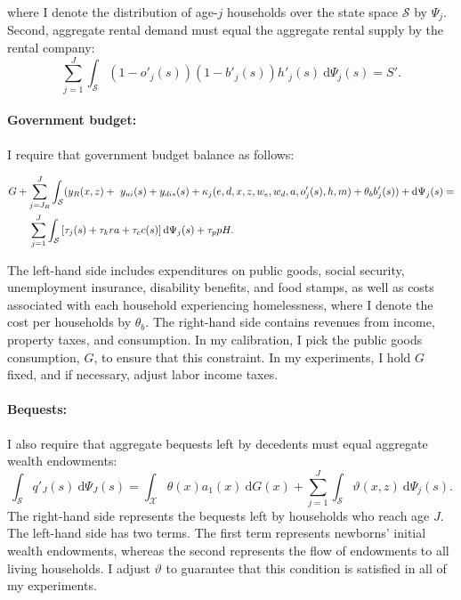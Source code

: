 \documentclass[parskip=full]{article}
\begin{document}
\noindent where I denote the distribution of age-$j$ households over the state space $\mathcal{S}$ by $\Psi_j$. Second, aggregate rental demand must equal the aggregate rental supply by the rental company:
\begin{equation}
    \label{eq:mkt_r}
    \sum_{j=1}^J \int_{\mathcal{S}} (1-o'_j(s))(1-b'_{j}(s))h'_j(s)\ \mathrm{d}\Psi_j(s) = S'.
\end{equation}

\paragraph{Government budget:} I require that government budget balance as follows:

\begin{align}
   & G + \sum_{j=J_{R}}^J \int_{\mathcal{S}} (y_{R}(x,z)+\ y_{ui}(s)+y_{dis}(s)+\kappa_{j}(e,d,x,z,w_{e},w_{d},a,o'_{j}(s),h,m)+\theta_{b}b'_{j}(s)) + \mathrm{d}\Psi_j(s)= \label{eq:gbc}\\ & \qquad
  \sum_{j=1}^J \int_{\mathcal{S}} \left[\tau_j(s)+\tau_k r a +\tau_{c}c(s)\right] \mathrm{d}\Psi_j(s) + \tau_p p H \notag.
\end{align}

\noindent The left-hand side includes expenditures on public goods, social security, unemployment insurance, disability benefits, and food stamps, as well as costs associated with each household experiencing homelessness, where I denote the cost per households by $\theta_{b}$. The right-hand side contains revenues from income, property taxes, and consumption. In my calibration, I pick the public goods consumption, $G$, to ensure that this constraint. In my experiments, I hold $G$ fixed, and if necessary, adjust labor income taxes.

\paragraph{Bequests:} I also require that aggregate bequests left by decedents must equal aggregate wealth endowments:
\begin{equation}
\label{eq:agg_bequests}
      \int_{\mathcal{S}} q'_J(s)\ \mathrm{d}\Psi_J(s) = \int_{\mathcal{X}} \theta(x)a_1(x)\ \mathrm{d}G(x) + \sum_{j=1}^J \int_{\mathcal{S}} \vartheta (x,z)\ \mathrm{d}\Psi_j(s).
\end{equation}
The right-hand side represents the bequests left by households who reach age $J$. The left-hand side has two terms. The first term represents newborns' initial wealth endowments, whereas the second represents the flow of endowments to all living households. I adjust $\vartheta$ to guarantee that this condition is satisfied in all of my experiments. 
\end{document}
